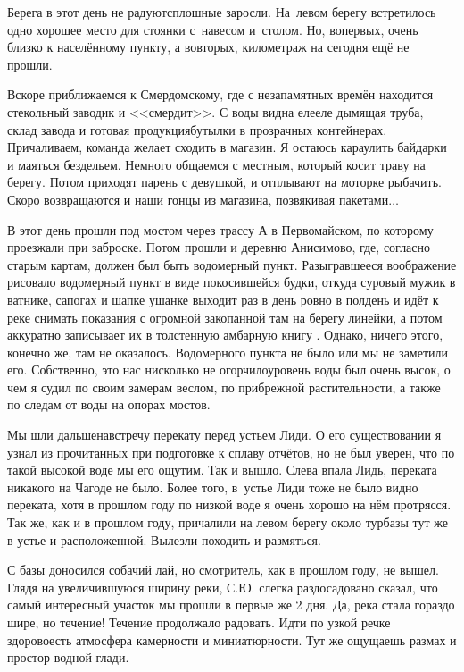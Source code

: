 Берега в этот день не радуют\mdash  сплошные заросли. На~левом берегу встретилось одно хорошее место для стоянки с~навесом и~столом. Но, во\sdash первых, очень близко к населённому пункту, а во\sdash вторых, километраж на сегодня ещё не прошли. 

Вскоре приближаемся к Смердомскому, где с незапамятных времён находится стекольный заводик и <<смердит>>. С воды видна еле\sdash еле дымящая труба, склад завода и готовая продукция\mdash  бутылки в прозрачных контейнерах. Причаливаем, команда желает сходить в магазин. Я остаюсь караулить байдарки и маяться бездельем. Немного общаемся с местным, который косит траву на берегу. Потом приходят парень с девушкой, и отплывают на моторке рыбачить. Скоро возвращаются и наши гонцы из магазина, позвякивая пакетами$\ldots$ 

В этот день прошли под мостом через трассу А в Первомайском, по которому проезжали при заброске. Потом прошли и деревню Анисимово, где, согласно старым картам, должен был быть водомерный пункт. Разыгравшееся воображение рисовало водомерный пункт в виде покосившейся будки, откуда суровый мужик в ватнике, сапогах и шапке ушанке выходит раз в день ровно в полдень и идёт к реке снимать показания с огромной закопанной там на берегу линейки, а потом аккуратно записывает их в толстенную амбарную книгу {}. Однако, ничего этого, конечно же, там не оказалось. Водомерного пункта не было или мы не заметили его. Собственно, это нас нисколько не огорчило\mdash уровень воды был очень высок, о чем я судил по своим замерам веслом, по прибрежной растительности, а также по следам от воды на опорах мостов. 

Мы шли дальше\mdash  навстречу перекату перед устьем Лиди. О его существовании я узнал из прочитанных при подготовке к сплаву отчётов, но не был уверен, что по такой высокой воде мы его ощутим. Так и вышло. Слева впала Лидь, переката никакого на Чагоде не было. Более того, в~устье Лиди тоже не было видно переката, хотя в прошлом году по низкой воде я очень хорошо на нём протрясся. Так же, как и в прошлом году, причалили на левом берегу около турбазы тут же в устье и расположенной. Вылезли походить и размяться. 

С базы доносился собачий лай, но смотритель, как в прошлом году, не вышел. Глядя на увеличившуюся ширину реки, С.Ю. слегка раздосадовано сказал, что самый интересный участок мы прошли в первые же 2 дня. Да, река стала гораздо шире, но течение! Течение продолжало радовать. Идти по узкой речке здорово\mdash  есть атмосфера камерности и миниатюрности. Тут же ощущаешь размах и простор водной глади.

